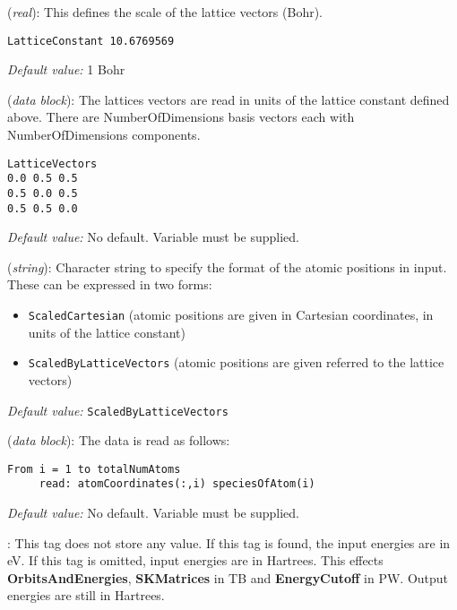\begin{description}
\itemsep 10pt
\parsep 0pt


\item[{\bf LatticeConstant}] ({\it real}):
This defines the scale of the lattice vectors (Bohr).
\begin{verbatim}
LatticeConstant 10.6769569
\end{verbatim}
{\it Default value:} 1 Bohr

\item[{\bf LatticeVectors}] ({\it data block}):
 The lattices vectors
are read in units of the lattice constant defined above.  There
are NumberOfDimensions basis vectors each with NumberOfDimensions
components.

\begin{verbatim}
LatticeVectors
0.0 0.5 0.5
0.5 0.0 0.5
0.5 0.5 0.0
\end{verbatim}

{\it Default value:} No default.  Variable must be supplied.

\item[{\bf AtomicCoordinatesFormat}] ({\it string}):
Character string to specify the format of the atomic positions in
input. These can be expressed in two forms:
\begin{itemize}
\item {\tt ScaledCartesian} (atomic positions are given
in Cartesian coordinates, in units of the lattice constant)
\item {\tt ScaledByLatticeVectors} (atomic positions
are given referred to the lattice vectors)
\end{itemize}

{\it Default value:} {\tt ScaledByLatticeVectors}

\item[{\bf AtomicCoordinatesAndAtomicSpecies}] ({\it data block}):
The data is read as follows:
\begin{verbatim}
From i = 1 to totalNumAtoms
     read: atomCoordinates(:,i) speciesOfAtom(i)
\end{verbatim}

{\it Default value:} No default.  Variable must be supplied.

\item[{\bf InputEnergiesInEV}]:  This tag does not store any value. If this tag
is found, the input energies are in eV. If this tag is omitted,
input energies are in Hartrees. This effects {\bf
OrbitsAndEnergies}, {\bf SKMatrices} in TB and {\bf EnergyCutoff}
in PW. Output energies are still in Hartrees.


\end{description}

